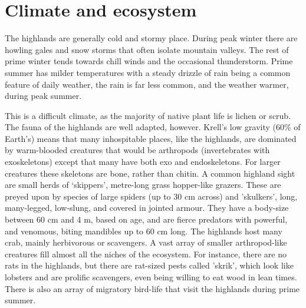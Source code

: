 \documentclass[a4paper,11pt,oneside]{book}
\begin{document}
\section{Climate and ecosystem}
The highlands are generally cold and stormy place. During peak winter there are howling gales and snow storms that often isolate mountain valleys. The rest of prime winter tends towards chill winds and the occasional thunderstorm. Prime summer has milder temperatures with a steady drizzle of rain being a common feature of daily weather, the rain is far less common, and the weather warmer, during peak summer. 

This is a difficult climate, as the majority of native plant life is lichen or scrub. The fauna of the highlands are well adapted, however. Krell's low gravity (60\% of Earth's) means that many inhospitable places, like the highlands, are dominated by warm-blooded creatures that would be arthropods (invertebrates with exoskeletons) except that many have both exo and endoskeletons. For larger creatures these skeletons are bone, rather than chitin. A common highland sight are small herds of `skippers', metre-long grass hopper-like grazers. These are preyed upon by species of large spiders (up to 30 cm across) and 'skulkers', long, many-legged, low-slung, and covered in jointed armour. They have a body-size between 60 cm and 4 m, based on age, and are fierce predators with powerful, and venomous, biting mandibles up to 60 cm long. The highlands host many crab, mainly herbivorous or scavengers. A vast array of smaller arthropod-like creatures fill almost all the niches of the ecosystem. For instance, there are no rats in the highlands, but there are rat-sized pests called 'skrik', which look like lobsters and are prolific scavengers, even being willing to eat wood in lean times. There is also an array of migratory bird-life that visit the highlands during prime summer. 
\end{document}
